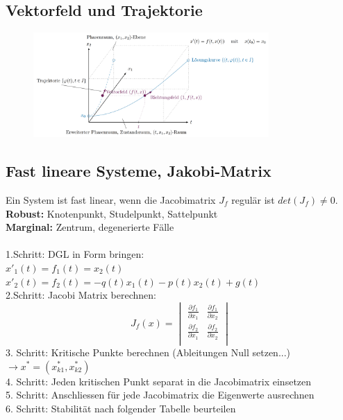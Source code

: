 \subsection{Vektorfeld und Trajektorie}
\begin{figure}[h!]
	\centering
	\includegraphics[width=0.8\textwidth]{./images/phasenraum.png}
\end{figure}


\subsection{Fast lineare Systeme, Jakobi-Matrix}
Ein System ist fast linear, wenn die Jacobimatrix $J_f$ regulär ist $det(J_f)\neq 0$. \\
\textbf{Robust:} Knotenpunkt, Studelpunkt, Sattelpunkt \\
\textbf{Marginal:} Zentrum, degenerierte Fälle \\ \\
1.Schritt: DGL in Form bringen:\\ 
$x'_1(t) = f_1(t) = x_2(t)$\\
$x'_2(t) = f_2(t) = -q(t)x_1(t)-p(t)x_2(t)+g(t)$\\
2.Schritt: Jacobi Matrix berechnen:\\
\begin{equation*}
	J_f(x) =    
	\begin{vmatrix} 
	        \frac{\partial f_1}{\partial x_1} & \frac{\partial f_1}{\partial x_2}\\ 
	        \frac{\partial f_2}{\partial x_1} & \frac{\partial f_2}{\partial x_2}\\   
	\end{vmatrix}
\end{equation*}
3. Schritt: Kritische Punkte berechnen (Ableitungen Null setzen...) $\rightarrow x^* = (x_{k1}^*, x_{k2}^*)$\\
4. Schritt: Jeden kritischen Punkt separat in die Jacobimatrix einsetzen\\
5. Schritt: Anschliessen für jede Jacobimatrix die Eigenwerte ausrechnen \\
6. Schritt: Stabilität nach folgender Tabelle beurteilen\\